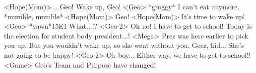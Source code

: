 <Hope(Mom)> ...Geo! 
Wake up, Geo! 
<Geo> *groggy* 
I can't eat anymore. *mumble, mumble* 
<Hope(Mom)> Geo! 
<Hope(Mom)> It's time to wake up! 
<Geo> *yawn*{15}{E1} What...!? 
<Geo-2> Oh no! I have to get to school! 
Today is the election for student body president...! 
<Mega> Prez was here earlier to pick you up. 
But you wouldn't wake up, so she went without you. 
Geez, kid... She's not going to be happy! 
<Geo-2> Oh boy... 
Either way, we have to get to school!! 
<Game> Geo's Team and Purpose have changed! 
